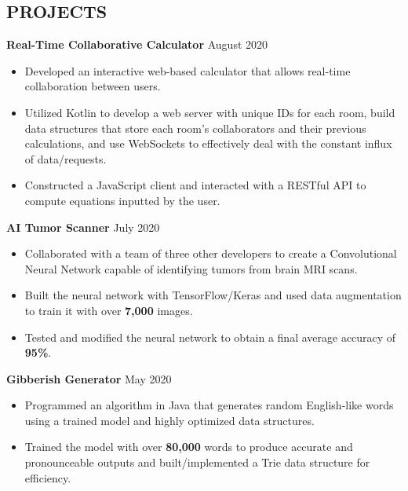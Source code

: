\documentclass[11pt]{res}
\begin{document}
\begin{footnotesize}
\begin{resume}
\section{PROJECTS} 
\textbf{Real-Time Collaborative Calculator} \hfill August 2020\vspace{-5.25mm}
\begin{itemize} \itemsep -2pt 
\item Developed an interactive web-based calculator that allows real-time collaboration between users. 
\vspace{1mm}
\item Utilized Kotlin to develop a web server with unique IDs for each room, build data structures that store each room's collaborators and their previous calculations, and use WebSockets to effectively deal with the constant influx of data/requests.
\vspace{-4mm}
\vspace{1mm}
\item Constructed a JavaScript client and interacted with a RESTful API to compute equations inputted by the user.  
\end{itemize}
\vspace{-2.5mm}
\textbf{AI Tumor Scanner}  \hfill July 2020\vspace{-5.25mm}
\begin{itemize} \itemsep -2pt 
\item Collaborated with a team of three other developers to create a Convolutional Neural Network capable of identifying tumors from brain MRI scans. 
\vspace{1mm}
\item Built the neural network with TensorFlow/Keras and used data augmentation to train it with over \textbf{7,000} images.
\vspace{1mm}
\item Tested and modified the neural network to obtain a final average accuracy of \textbf{95\%}.
\end{itemize}
\vspace{-2.5mm}
\textbf{Gibberish Generator} \hfill May 2020\vspace{-5.25mm}
\begin{itemize} \itemsep -2pt 
\item Programmed an algorithm in Java that generates random English-like words using a trained model and highly optimized data structures.  
\vspace{1mm}
\item Trained the model with over \textbf{80,000} words to produce accurate and pronounceable outputs and built/implemented a Trie data structure for efficiency.

\end{itemize}
\end{resume}
\end{footnotesize}
\end{document}
